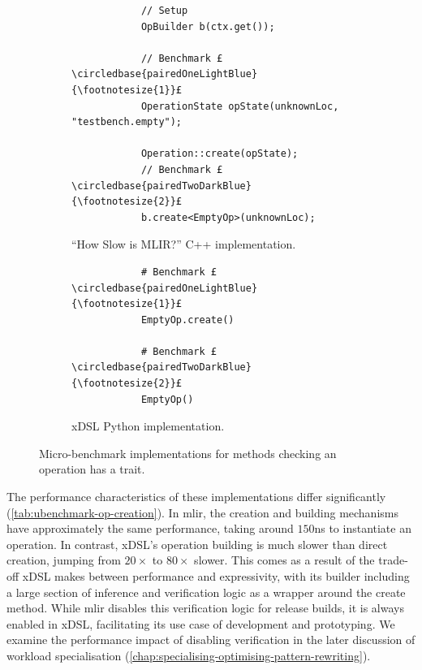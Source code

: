 \begin{figure}[H]
    \centering
    \begin{subfigure}[b]{0.45\textwidth}
       \centering
        \begin{verbatim}
            // Setup
            OpBuilder b(ctx.get());

            // Benchmark £\circledbase{pairedOneLightBlue}{\footnotesize{1}}£
            OperationState opState(unknownLoc, "testbench.empty");

            Operation::create(opState);
            // Benchmark £\circledbase{pairedTwoDarkBlue}{\footnotesize{2}}£
            b.create<EmptyOp>(unknownLoc);
        \end{verbatim}
        \caption{``How Slow is MLIR?'' C++ implementation.}
        \label{listing:ubenchmark-op-creation-bench-mlir}
    \end{subfigure}
    \hfill
    \begin{subfigure}[b]{0.45\textwidth}
        \centering
        \begin{verbatim}
            # Benchmark £\circledbase{pairedOneLightBlue}{\footnotesize{1}}£
            EmptyOp.create()

            # Benchmark £\circledbase{pairedTwoDarkBlue}{\footnotesize{2}}£
            EmptyOp()
        \end{verbatim}
        \footnotesize\vspace{3.5em}
        \caption{xDSL Python implementation.}
        \label{listing:ubenchmark-op-creation-bench-xdsl}
    \end{subfigure}
    \vspace{1em}
    \captionsetup{name=Listing}
    \caption{Micro-benchmark implementations for methods checking an operation has a trait.}
    \label{listing:ubenchmark-op-creation-bench}
\end{figure}

The performance characteristics of these implementations differ significantly (\autoref{tab:ubenchmark-op-creation}).
In \ac{mlir}, the creation and building mechanisms have approximately the same performance, taking around $150$ns to instantiate an operation. In contrast, xDSL's operation building is much slower than direct creation, jumping from $20\times$ to $80\times$ slower. This comes as a result of the trade-off xDSL makes between performance and expressivity, with its builder including a large section of inference and verification logic as a wrapper around the create method. While \ac{mlir} disables this verification logic for release builds, it is always enabled in xDSL, facilitating its use case of development and prototyping. We examine the performance impact of disabling verification in the later discussion of workload specialisation (\autoref{chap:specialising-optimising-pattern-rewriting}).


